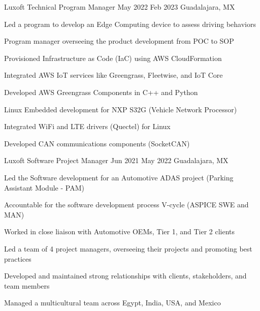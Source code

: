 \documentclass{resume} %
\begin{document}
\job
    {Luxoft}
    {Technical Program Manager}
    {May 2022}
    {Feb 2023}
    {Guadalajara, MX}
    {
    \begin{itemize-bullets}
    \item{Led a program to develop an Edge Computing device to assess driving behaviors}
    \item{Program manager overseeing the product development from POC to SOP}
    \item{Provisioned Infrastructure as Code (IaC) using AWS CloudFormation}
    \item{Integrated AWS IoT services like Greengrass, Fleetwise, and IoT Core}
    \item{Developed AWS Greengrass Components in C++ and Python}
    \item{Linux Embedded development for NXP S32G (Vehicle Network Processor)}
    \item{Integrated WiFi and LTE drivers (Quectel) for Linux}
    \item{Developed CAN communications components (SocketCAN)}
    \end{itemize-bullets}
    }


\job
    {Luxoft}
    {Software Project Manager}
    {Jun 2021}
    {May 2022}
    {Guadalajara, MX}
    {
    \begin{itemize-bullets}
    \item{Led the Software development for an Automotive ADAS project (Parking Assistant Module - PAM)}
    \item{Accountable for the software development process V-cycle (ASPICE SWE and MAN)}
    \item{Worked in close liaison with Automotive OEMs, Tier 1, and Tier 2 clients}
    \item{Led a team of 4 project managers, overseeing their projects and promoting best practices}
    \item{Developed and maintained strong relationships with clients, stakeholders, and team members}
    \item{Managed a multicultural team across Egypt, India, USA, and Mexico}
    \end{itemize-bullets}
    }
\end{document}
